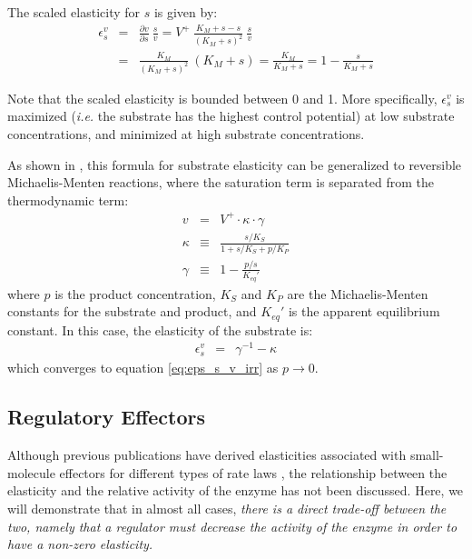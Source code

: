 \documentclass[12pt,a4paper]{article}
\begin{document}
The scaled elasticity for $s$ is given by:
\begin{eqnarray}
    \epsilon_s^v &=& \frac{\partial v}{\partial s} ~ \frac{s}{v} = V^+ ~ \frac{K_M + s - s}{(K_M + s)^2} ~ \frac{s}{v} \nonumber \\
    &=& \frac{K_M}{(K_M + s)^2} ~ (K_M + s) = \frac{K_M}{K_M + s} = 1 - \frac{s}{K_M + s}\label{eq:eps_s_v_irr}
\end{eqnarray}

\begin{center}
\end{center}

Note that the scaled elasticity is bounded between 0 and 1. More specifically, $\epsilon_s^v$ is maximized (\textit{i.e.} the substrate has the highest control potential) at low substrate concentrations, and minimized at high substrate concentrations.

As shown in \cite{Noor2013-vv}, this formula for substrate elasticity can be generalized to reversible Michaelis-Menten reactions, where the saturation term is separated from the thermodynamic term:
\begin{eqnarray}
    v &=& V^+ \cdot \kappa \cdot \gamma \\
    \kappa &\equiv& \frac{s/K_S}{1 + s/K_S + p/K_P} \\
    \gamma &\equiv& 1 - \frac{p/s}{K_{eq}'}
\end{eqnarray}
where $p$ is the product concentration, $K_S$ and $K_P$ are the Michaelis-Menten constants for the substrate and product, and $K_{eq}'$ is the apparent equilibrium constant. In this case, the elasticity of the substrate is:
\begin{eqnarray}
    \epsilon_s^v &=& \gamma^{-1} - \kappa
\end{eqnarray}
which converges to equation \ref{eq:eps_s_v_irr} as $p \rightarrow 0$.

\subsection{Regulatory Effectors}
Although previous publications have derived elasticities associated with small-molecule effectors for different types of rate laws \cite{Heinrich1974-yj, Liebermeister2010-vd}, the relationship between the elasticity and the relative activity of the enzyme has not been discussed. Here, we will demonstrate that in almost all cases, \emph{there is a direct trade-off between the two, namely that a regulator must decrease the activity of the enzyme in order to have a non-zero elasticity.}
\end{document}
